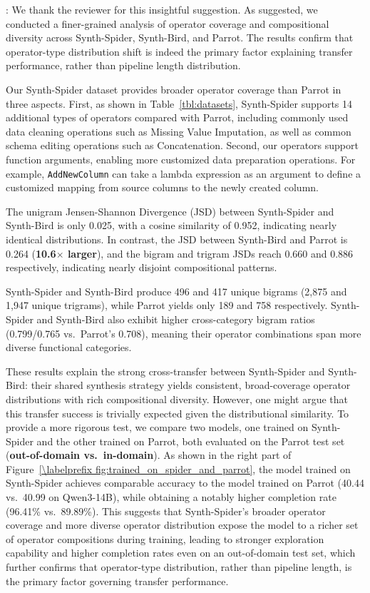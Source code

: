 

: 
We thank the reviewer for this insightful suggestion. As suggested, we conducted a finer-grained analysis of operator coverage and compositional diversity across Synth-Spider, Synth-Bird, and Parrot. The results confirm that operator-type distribution shift is indeed the primary factor explaining transfer performance, rather than pipeline length distribution.

Our Synth-Spider dataset provides broader operator coverage than Parrot in three aspects. 
First, as shown in Table~\ref{tbl:datasets}, Synth-Spider supports 14 additional types of operators compared with Parrot, including commonly used data cleaning operations such as Missing Value Imputation, as well as common schema editing operations such as Concatenation. 
Second, our operators support function arguments, enabling more customized data preparation operations. 
For example, \texttt{AddNewColumn} can take a lambda expression as an argument to define a customized mapping from source columns to the newly created column. 

 The unigram Jensen-Shannon Divergence (JSD) between Synth-Spider and Synth-Bird is only 0.025, with a cosine similarity of 0.952, indicating nearly identical distributions. In contrast, the JSD between Synth-Bird and Parrot is 0.264 (\textbf{10.6$\times$ larger}), and the bigram and trigram JSDs reach 0.660 and 0.886 respectively, indicating nearly disjoint compositional patterns.

 Synth-Spider and Synth-Bird produce 496 and 417 unique bigrams (2,875 and 1,947 unique trigrams), while Parrot yields only 189 and 758 respectively. Synth-Spider and Synth-Bird also exhibit higher cross-category bigram ratios (0.799/0.765 vs.\ Parrot's 0.708), meaning their operator combinations span more diverse functional categories.

These results explain the strong cross-transfer between Synth-Spider and Synth-Bird: their shared synthesis strategy yields consistent, broad-coverage operator distributions with rich compositional diversity. However, one might argue that this transfer success is trivially expected given the distributional similarity. To provide a more rigorous test, we compare two models, one trained on Synth-Spider and the other trained on Parrot, both evaluated on the Parrot test set (\textbf{out-of-domain vs.\ in-domain}). As shown in the right part of Figure~\ref{\labelprefix fig:trained_on_spider_and_parrot}, the model trained on Synth-Spider achieves comparable accuracy to the model trained on Parrot (40.44 vs.\ 40.99 on Qwen3-14B), while obtaining a notably higher completion rate (96.41\% vs.\ 89.89\%). This suggests that Synth-Spider's broader operator coverage and more diverse operator distribution expose the model to a richer set of operator compositions during training, leading to stronger exploration capability and higher completion rates even on an out-of-domain test set, which further confirms that operator-type distribution, rather than pipeline length, is the primary factor governing transfer performance.


